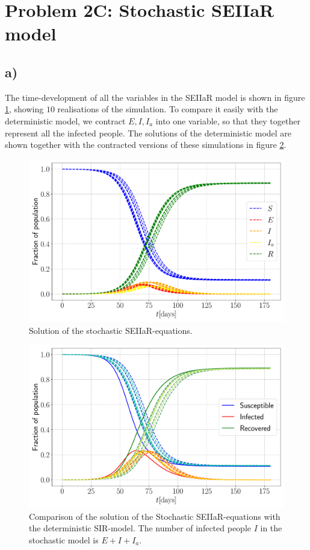 \section{Problem 2C: Stochastic SEIIaR model}

\subsection{a)}

The time-development of all the variables in the SEIIaR model is shown in figure \ref{fig:SEIIaR}, showing $10$ realisations of the simulation. To compare it easily with the deterministic model, we contract $E,I,I_a$ into one variable, so that they together represent all the infected people. The solutions of the deterministic model are shown together with the contracted versions of these simulations in figure \ref{fig:SEIIaR_compare}. 

\begin{figure}[htb]
	\centering
	\includegraphics[width=0.8\columnwidth]{../fig/2Ca_SEIIaR.pdf}
	\caption{Solution of the stochastic SEIIaR-equations.}
	\label{fig:SEIIaR}
\end{figure}

\begin{figure}[htb]
	\centering
	\includegraphics[width=0.8\columnwidth]{../fig/2Ca_comp.pdf}
	\caption{Comparison of the solution of the Stochastic SEIIaR-equations with the deterministic SIR-model. The number of infected people $I$ in the stochastic model is $E + I + I_a$.}
	\label{fig:SEIIaR_compare}
\end{figure}


